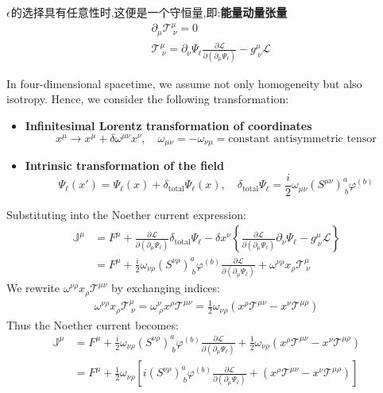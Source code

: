 \noindent
  $\epsilon$的选择具有任意性时,这便是一个守恒量,即:\textbf{能量动量张量}
    \begin{equation}
        \begin{aligned}
          &\partial_\mu \mathcal{T}^\mu_{\ \nu} = 0\\
          &\mathcal{T}^\mu_{\ \nu} = \partial_\nu \Psi_\ell \frac{\partial \mathscr{L}}{\partial (\partial_\mu \Psi_\ell)}
          - g^\mu_{\ \nu} \mathscr{L}
        \end{aligned}
  \end{equation}


In four-dimensional spacetime, we assume not only homogeneity but also isotropy. Hence, we consider the following transformation:
\begin{itemize}
  \item \textbf{Infinitesimal Lorentz transformation of coordinates}
  \[
    x^\mu \rightarrow x^\mu + \delta\omega^{\mu\nu} x^\nu, \quad \omega_{\mu\nu} = -\omega_{\nu\mu} = \text{constant antisymmetric tensor}
  \]
  \item \textbf{Intrinsic transformation of the field}
  \[
    \Psi_\ell (x') = \Psi_\ell(x) + \delta_{\text{total}} \Psi_\ell(x), \quad
    \delta_{\text{total}} \Psi_\ell = \frac{i}{2} \omega_{\mu\nu} (S^{\mu\nu})^{a}_{\ b} \varphi ^{(b)}
  \]
\end{itemize}
Substituting into the Noether current expression:
\begin{align*}
   \mathbb{J}^\mu &= F^\mu +
   \frac{\partial \mathscr{L}}{\partial (\partial_\mu \Psi_\ell)}
   \delta_{\text{total}} \Psi_\ell
  - \delta x^\nu \left\{ \frac{\partial \mathscr{L}}{\partial (\partial_\mu \Psi_\ell)} \partial_\nu \Psi_\ell
  - g^\mu_{\ \nu} \mathscr{L} \right\} \\
  &= F^\mu +
  \frac{i}{2} \omega_{\nu\rho} (S^{\nu\rho})^{a}_{\ b} \varphi ^{(b)}
  \frac{\partial \mathscr{L}}{\partial (\partial_\mu \Psi_\ell)} +
  \omega^{\nu\rho} x_\rho \mathcal{T}^\mu_{\ \nu}
\end{align*}
We rewrite $\omega^{\nu\rho} x_\rho \mathcal{T}^{\mu\nu}$ by exchanging indices:
\begin{align*}
\omega^{\nu\rho} x_\rho \mathcal{T}^\mu_{\ \nu} 
= \omega^\nu_{\ \rho} x^\rho \mathcal{T}^{\mu\nu}
= \frac{1}{2} \omega_{\nu\rho} \left( x^\rho \mathcal{T}^{\mu\nu} 
- x^\nu \mathcal{T}^{\mu\rho} \right)
\end{align*}
Thus the Noether current becomes:
\begin{align*}
  \mathbb{J}^\mu &= F^\mu +
  \frac{i}{2} \omega_{\nu\rho} (S^{\nu\rho})^{a}_{\ b} \varphi ^{(b)}
  \frac{\partial \mathscr{L}}{\partial (\partial_\mu \Psi_\ell)} +
  \frac{1}{2} \omega_{\nu\rho} \left( x^\rho \mathcal{T}^{\mu\nu} 
  - x^\nu \mathcal{T}^{\mu\rho} \right) \\
  &= F^\mu +
  \frac{1}{2} \omega_{\nu\rho} \left[ i (S^{\nu\rho})^{a}_{\ b} \varphi ^{(b)}
  \frac{\partial \mathscr{L}}{\partial (\partial_\mu \Psi_\ell)} +
   \left( x^\rho \mathcal{T}^{\mu\nu} 
  - x^\nu \mathcal{T}^{\mu\rho} \right) \right]
\end{align*}

